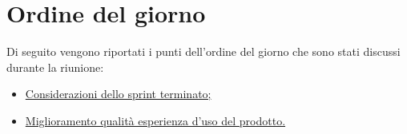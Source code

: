 \clearpage
\section{Ordine del giorno}
Di seguito vengono riportati i punti dell’ordine del giorno che sono stati discussi durante la riunione:
\begin{itemize}
	\item \hyperref[sec:considerazioni]{Considerazioni dello sprint terminato;}
	\item \hyperref[sec:migliorie]{Miglioramento qualità esperienza d'uso del prodotto.}
\end{itemize}